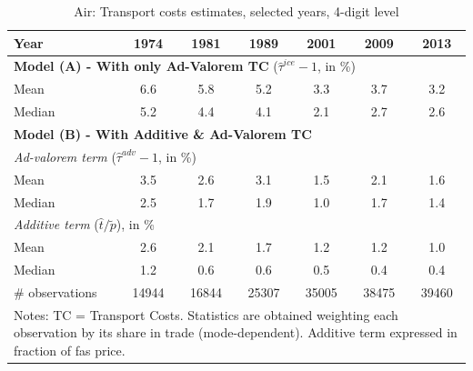\documentclass[11pt,twoside, authoryear]{elsarticle}
\begin{document}
\begin{table}[htbp]
  \centering
  \caption{Air: Transport costs estimates, selected years, 4-digit level}
\begin{center}
  \footnotesize{
    \begin{tabular}{l|cccccc}
   \hline\hline
Year & 1974  & 1981  & 1989  & 2001  & 2009  & 2013 \\ \hline
\multicolumn{7}{l}{\textbf{Model (A) - With only Ad-Valorem TC} ($\widehat{\tau}^{ice}-1$, in \%) }  \\
\hline
Mean  & 6.6 & 5.8 & 5.2 & 3.3 & 3.7 & 3.2 \\
Median & 5.2 & 4.4 & 4.1 & 2.1 & 2.7 & 2.6 \\
\hline
\multicolumn{7}{l}{\textbf{Model (B) - With Additive \& Ad-Valorem TC}}  \\ \hline
\multicolumn{7}{l}{\textit{Ad-valorem term }($\widehat{\tau}^{adv}-1$, in \%) }   \\ \hline
Mean  & 3.5 & 2.6 & 3.1 & 1.5 & 2.1 & 1.6  \\
Median & 2.5 & 1.7 & 1.9 & 1.0 & 1.7 & 1.4  \\
\hline
\multicolumn{7}{l}{\textit{Additive term} ($\widehat{t}/\widetilde{p}$), in \%}    \\ \hline
Mean  & 2.6 & 2.1 & 1.7 & 1.2 &1.2 & 1.0 \\
Median & 1.2 & 0.6 & 0.6 & 0.5 & 0.4 & 0.4  \\
\hline
\# observations & 14944 & 16844 & 25307 & \multicolumn{1}{c}{35005} & \multicolumn{1}{c}{38475} & \multicolumn{1}{c}{39460}  \\
\hline\hline
\multicolumn{7}{l}{\parbox[l]{11cm}{ \vspace{7pt}\scriptsize{Notes: TC = Transport Costs.
Statistics are obtained weighting each observation by its share in trade (mode-dependent).
Additive term expressed in fraction of fas price.}}}
\end{tabular}%
}
\end{center}
  \label{tab:result_air_rob}
\end{table}%
\end{document}

